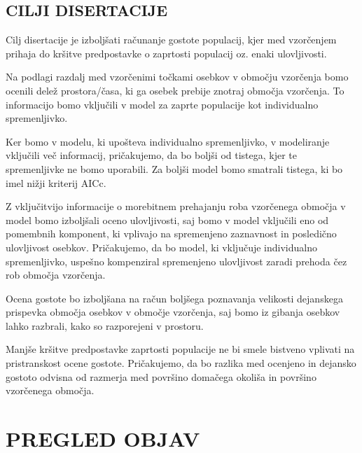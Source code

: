 \subsection{CILJI DISERTACIJE}
Cilj disertacije je izboljšati računanje gostote populacij, kjer med vzorčenjem prihaja do kršitve predpostavke o zaprtosti populacij oz. enaki ulovljivosti.

Na podlagi razdalj med vzorčenimi točkami osebkov v območju vzorčenja bomo ocenili delež prostora/časa, ki ga osebek prebije znotraj območja vzorčenja. To informacijo bomo vključili v model za zaprte populacije kot individualno spremenljivko.

Ker bomo v modelu, ki upošteva individualno spremenljivko, v modeliranje vključili več informacij, pričakujemo, da bo boljši od tistega, kjer te spremenljivke ne bomo uporabili. Za boljši model bomo smatrali tistega, ki bo imel nižji kriterij AICc.

Z vključitvijo informacije o morebitnem prehajanju roba vzorčenega območja v model bomo izboljšali oceno ulovljivosti, saj bomo v model vključili eno od pomembnih komponent, ki vplivajo na spremenjeno zaznavnost in posledično ulovljivost osebkov. Pričakujemo, da bo model, ki vključuje individualno spremenljivko, uspešno kompenziral spremenjeno ulovljivost zaradi prehoda čez rob območja vzorčenja.

Ocena gostote bo izboljšana na račun boljšega poznavanja velikosti dejanskega prispevka območja osebkov v območje vzorčenja, saj bomo iz gibanja osebkov lahko razbrali, kako so razporejeni v prostoru.

Manjše kršitve predpostavke zaprtosti populacije ne bi smele bistveno vplivati na pristranskost ocene gostote. Pričakujemo, da bo razlika med ocenjeno in dejansko gostoto odvisna od razmerja med površino domačega okoliša in površino vzorčenega območja.

\newpage

\section{PREGLED OBJAV}
